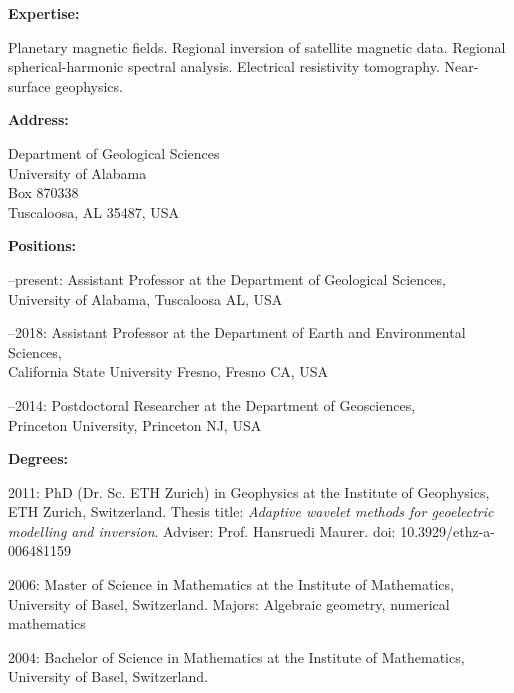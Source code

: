 \documentclass[10pt]{article}
\begin{document}
\spc
\textbf{\tsize Expertise:}

\spcp Planetary magnetic fields. Regional inversion of satellite
magnetic data. Regional spherical-harmonic spectral analysis.
Electrical resistivity tomography. Near-surface geophysics.

\spc
\textbf{\tsize Address:}

\spcp
Department of Geological Sciences\\
University of Alabama\\
Box 870338\\
Tuscaloosa, AL 35487, USA



\spc
\textbf{\tsize Positions:}

--present:
Assistant Professor at the Department of Geological Sciences, \\University of Alabama, Tuscaloosa AL, USA

--2018:
Assistant Professor at the Department of Earth and Environmental Sciences, \\California State University Fresno, Fresno CA, USA

--2014:
Postdoctoral Researcher at the Department of Geosciences, \\Princeton University, Princeton NJ, USA


\spc
\textbf{\tsize Degrees:}

\spcp
\par{2011:} PhD (Dr. Sc. ETH Zurich) in Geophysics at the Institute of Geophysics,
ETH Zurich, Switzerland.
Thesis title: \emph{ Adaptive wavelet methods for geoelectric modelling and inversion}.
Adviser: Prof. Hansruedi Maurer.
doi: 10.3929/ethz-a-006481159

\spcp
\par{2006:} Master of Science in Mathematics at the Institute of Mathematics,
 University of Basel, Switzerland.
 Majors: Algebraic geometry, numerical mathematics

 \spcp
\par{ 2004:} Bachelor of Science in Mathematics at the Institute of Mathematics, 
University of Basel, Switzerland.
\end{document}

